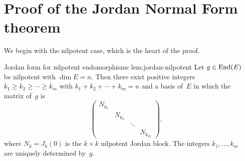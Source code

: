 \section{Proof of the Jordan Normal Form theorem}\label{sec:jordan-proof}

We begin with the nilpotent case, which is the heart of the proof.

\begin{lemma}{Jordan form for nilpotent endomorphisms}%
{lem:jordan-nilpotent}
Let $g \in \operatorname{End}(E)$ be nilpotent with $\dim E = n$.  Then there
exist positive integers $k_1 \geq k_2 \geq \cdots \geq k_m$ with
$k_1 + k_2 + \cdots + k_m = n$ and a basis of~$E$ in which the
matrix of~$g$ is
\[
  \begin{pmatrix}
    N_{k_1} &         &        \\
            & N_{k_2} &        \\
            &         & \ddots \\
            &         &        & N_{k_m}
  \end{pmatrix},
\]
where $N_k = J_k(0)$ is the $k \times k$ nilpotent Jordan block.
The integers $k_1, \ldots, k_m$ are uniquely determined by~$g$.
\end{lemma}

